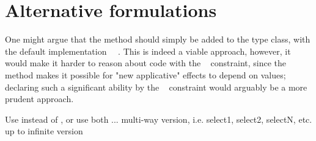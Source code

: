 \section{Alternative formulations}\label{sec-alternatives}

One might argue that the  method should simply be added to the
 type class, with the default implementation
~\hs{=}~. This is indeed a viable approach, however, it
would make it harder to reason about code with the ~
constraint, since the  method makes it possible for "new applicative"
effects to depend on values; declaring such a significant ability by the
~ constraint would arguably be a more prudent approach.

Use  instead of , or use both
...
multi-way version, i.e. select1, select2, selectN, etc. up to infinite version